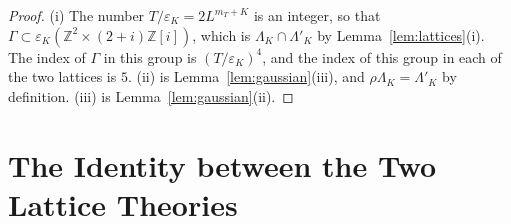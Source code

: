 \documentclass[11pt]{preprint}
\numberwithin{equation}{section}
\theoremstyle{definition}
\theoremstyle{remark}
\theoremstyle{plain}
\begin{document}
\begin{proof}
(i) The number $T/\varepsilon_K = 2L^{m_T+K}$ is an integer, so that $\Gamma \subset \varepsilon_K(\mathbb Z^2 \times (2 + i)\mathbb Z[i])$, which is $\Lambda_K \cap \Lambda'_K$ by Lemma~\ref{lem:lattices}(i). The index of $\Gamma$ in this group is $(T/\varepsilon_K)^4$, and the index of this group in each of the two lattices is $5$. (ii) is Lemma~\ref{lem:gaussian}(iii), and $\rho\Lambda_K = \Lambda'_K$ by definition. (iii) is Lemma~\ref{lem:gaussian}(ii).
\end{proof}

\section{The Identity between the Two Lattice Theories}\label{sec:identity}
\end{document}

